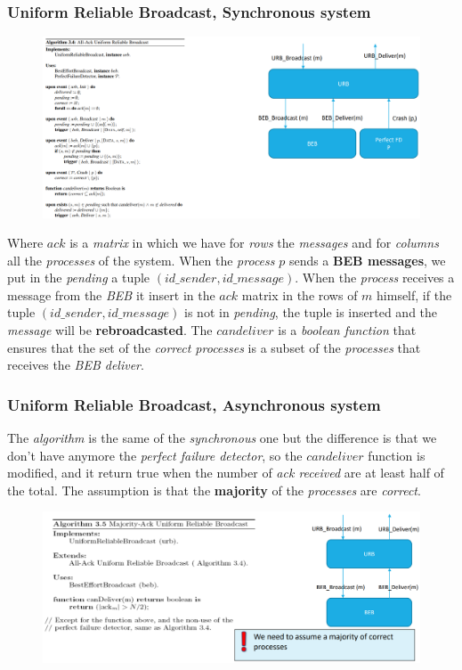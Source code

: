 \documentclass{article}
\begin{document}
\subsubsection{Uniform Reliable Broadcast, Synchronous system}
\begin{figure}[H]
  \centering
  \includegraphics[scale=0.85,left]{cattura38.png}
\end{figure}
Where $ack$ is a \emph{matrix} in which we have for \emph{rows} the \emph{messages} and for \emph{columns} all the \emph{processes} of the system. When the \emph{process} $p$ sends a \textbf{BEB messages}, we put in the \emph{pending} a tuple $(id\_sender,id\_message)$. When the \emph{process} receives a message from the \emph{BEB} it insert in the $ack$ matrix in the rows of $m$ himself, if the tuple $(id\_sender,id\_message)$ is not in \emph{pending}, the tuple is inserted and the \emph{message} will be \textbf{rebroadcasted}. The $candeliver$ is a \emph{boolean function} that ensures that the set of the \emph{correct processes} is a subset of the \emph{processes} that receives the \emph{BEB deliver}.
\subsubsection{Uniform Reliable Broadcast, Asynchronous system}
The \emph{algorithm} is the same of the \emph{synchronous} one but the difference is that we don't have anymore the \emph{perfect failure detector}, so the $candeliver$ function is modified, and it return true when the number of \emph{ack received} are at least half of the total. The assumption is that the \textbf{majority} of the \emph{processes} are \emph{correct}. 
\begin{figure}[H]
  \centering
  \includegraphics[scale=0.7,left]{cattura39.png}
\end{figure}
\end{document}
